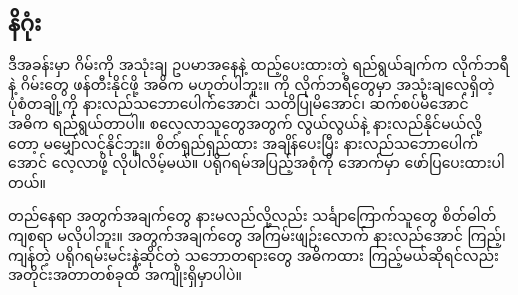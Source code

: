 \subsection*{နိဂုံး}
ဒီအခန်းမှာ  ဂိမ်းကို အသုံးချ ဥပမာအနေနဲ့ ထည့်ပေးထားတဲ့ ရည်ရွယ်ချက်က  လိုက်ဘရီနဲ့ ဂိမ်းတွေ ဖန်တီးနိုင်ဖို့ အဓိက မဟုတ်ပါဘူး။  ကို လိုက်ဘရီတွေမှာ အသုံးချလေ့ရှိတဲ့ ပုံစံတချို့ကို နားလည်သဘောပေါက်အောင်၊ သတိပြုမိအောင်၊ ဆက်စပ်မိအောင် အဓိက ရည်ရွယ်တာပါ။ စလေ့လာသူတွေအတွက် လွယ်လွယ်နဲ့ နားလည်နိုင်မယ်လို့တော့ မမျှော်လင့်နိုင်ဘူး။ စိတ်ရှည်ရှည်ထား အချိန်ပေးပြီး နားလည်သဘောပေါက်အောင် လေ့လာဖို့ လိုပါလိမ့်မယ်။ ပရိုဂရမ်အပြည့်အစုံကို အောက်မှာ ဖော်ပြပေးထားပါတယ်။ 

တည်နေရာ အတွက်အချက်တွေ နားမလည်လို့လည်း သင်္ချာကြောက်သူတွေ စိတ်ဓါတ်ကျစရာ မလိုပါဘူး။ အတွက်အချက်တွေ အကြမ်းဖျဉ်းလောက် နားလည်အောင် ကြည့်၊ ကျန်တဲ့ ပရိုဂရမ်းမင်းနဲ့ဆိုင်တဲ့ သဘောတရားတွေ အဓိကထား ကြည့်မယ်ဆိုရင်လည်း အတိုင်းအတာတစ်ခုထိ အကျိုးရှိမှာပါပဲ။

